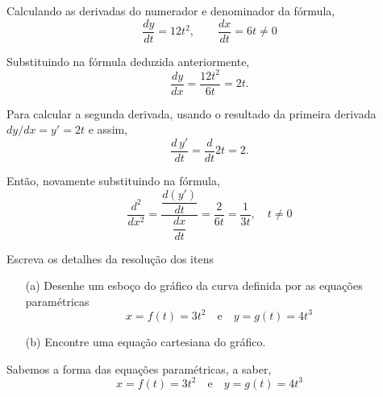 \solo
Calculando as derivadas do numerador e denominador da fórmula,
\begin{equation*}
\frac{dy}{dt}= 12t^{2}, \qquad \frac{dx}{dt}=6t \neq 0
\end{equation*}

Substituindo na fórmula deduzida anteriormente,
\begin{equation*}
  \frac{dy}{dx}=\frac{12t^{2}}{6t}=2t.
\end{equation*}

Para calcular a segunda derivada, usando o resultado da primeira derivada \(dy/dx=y'=2t\) e assim,
\begin{equation*}
  \frac{d\, y'}{dt}=\frac{d}{dt}2t=2.
\end{equation*}

Então, novamente substituindo na fórmula,
\begin{equation*}
  \frac{d^{2}}{dx^{2}}=\dfrac{\dfrac{d(y')}{dt}}{\dfrac{dx}{dt}}=\frac{2}{6t}=\frac{1}{3t}, \quad t \neq 0
\end{equation*}


\begin{exc}\label{exer:14-3-4}
Escreva os detalhes da resolução dos itens
\begin{enumerate}
  \item[\rm{(a)}]
Desenhe um esboço do gráfico da curva definida por as equações paramétricas
\begin{equation*}
x = f(t) = 3t^{2} \quad \text{e}\quad y = g(t)=4t^{3}
\end{equation*}
  \item[\rm{(b)}] Encontre uma equação cartesiana do gráfico.
\end{enumerate}
\end{exc}

\solo
Sabemos a forma das equações paramétricas, a saber,
\begin{equation*}
x=f(t)= 3t^{2} \quad \text{e}\quad y = g(t)=4t^{3}
\end{equation*}

